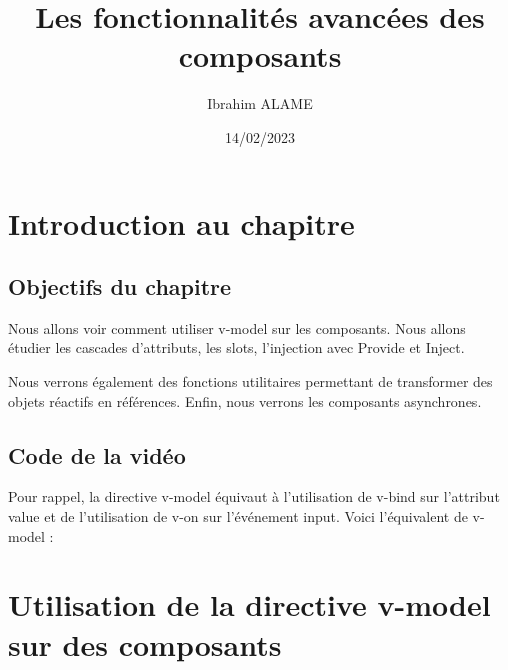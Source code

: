 \documentclass{article}
\title{Les fonctionnalités avancées des composants}
\author{Ibrahim ALAME}
\date{14/02/2023}
\begin{document}
\maketitle

\section{Introduction au chapitre}
\subsection{Objectifs du chapitre}
Nous allons voir comment utiliser {\color{monOrange}v-model} sur les composants. Nous allons étudier les cascades d'attributs, les {\color{monOrange}slots}, l'injection avec {\color{monOrange}Provide} et {\color{monOrange}Inject}.

Nous verrons également des fonctions utilitaires permettant de transformer des objets réactifs en références. Enfin, nous verrons les composants asynchrones.

\subsection{Code de la vidéo}
Pour rappel, la directive {\color{monOrange}v-model} équivaut à l'utilisation de {\color{monOrange}v-bind} sur l'attribut value et de l'utilisation de {\color{monOrange}v-on} sur l'événement input. Voici l'équivalent de {\color{monOrange}v-model} :



\section{Utilisation de la directive v-model sur des composants}
\end{document}
